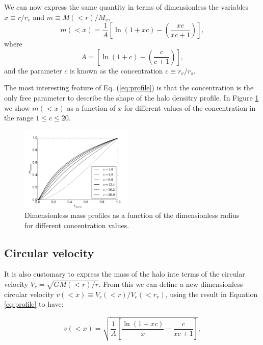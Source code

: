 \documentclass[useAMS,usenatbib]{mn2e}
\begin{document}
We can now express the same quantity in terms of dimensionless the
variables $x\equiv r/r_v$ and $m\equiv M(<r)/M_v$,
%
\begin{equation}
m(<x) =
\frac{1}{A}\left[\ln\left(1+xc\right)-\left(\frac{xc}{xc+1}\right)\right],
\label{eq:profile}
\end{equation}
%
where 
%
\begin{equation}
A=\left[\ln\left(1+c\right)-\left(\frac{c}{c+1}\right)\right],
\end{equation}
%
and the parameter $c$ is known as the concentration $c\equiv r_v/r_s$.

The most interesting feature of Eq. (\ref{eq:profile}) is that the
concentration is the only free parameter to describe the shape of the
halo densitry profile. In Figure \ref{fig:profiles} we show $m(<x)$ as
a function of $x$ for different values of the concentration in the range
$1\leq c \leq 20$.  

\begin{figure}
\begin{center}
  \includegraphics[width=0.48\textwidth]{nfw_normalized.pdf}
\end{center}
\caption{Dimensionless mass profiles as a function of the
  dimensionless radius for different concentration values.
    \label{fig:profiles}}
\end{figure}


\subsection{Circular velocity}

It is also customary to express the mass of the halo inte terms of the
circular velocity $V_{c}=\sqrt{GM(<r)/r}$. From this we can
define a new dimensionless circular velocity $v(<x)\equiv
V_{c}(<r)/V_{c}(<r_v)$, using the result in Equation \ref{eq:profile}
to have:

\begin{equation}
v(<x)=\sqrt{\frac{1}{A}\left[\frac{\ln\left(1+xc\right)}{x}-\frac{c}{xc+1}\right]},
\end{equation}
\end{document}
